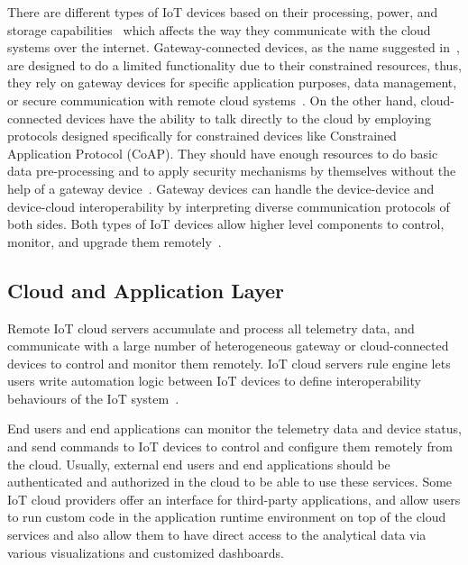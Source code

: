 There are different types of IoT devices based on their processing, power, and storage capabilities~\cite{bormann2014terminology} which affects the way they communicate with the cloud systems over the internet. Gateway-connected devices, as the name suggested in~\cite{securityUsenix2019}, are designed to do a limited functionality due to their constrained resources, thus, they rely on gateway devices for specific application purposes, data management, or secure communication with remote cloud systems~\cite{bormann2014terminology}. On the other hand, cloud-connected devices have the ability to talk directly to the cloud by employing protocols designed specifically for constrained devices like Constrained Application Protocol (CoAP). They should have enough resources to do basic data pre-processing and to apply security mechanisms by themselves without the help of a gateway device~\cite{stojkoska2017review,securityUsenix2019}. Gateway devices can handle the device-device and device-cloud interoperability by interpreting diverse communication protocols of both sides\cite{vcolakovic2018IoT}. Both types of IoT devices allow higher level components to control, monitor, and upgrade them remotely~\cite{eclipse2016three}.

\subsection{Cloud and Application Layer}
Remote IoT cloud servers accumulate and process all telemetry data, and communicate with a large number of heterogeneous gateway or cloud-connected devices to control and monitor them remotely. IoT cloud servers rule engine lets users write automation logic between IoT devices to define interoperability behaviours of the IoT system~\cite{securityUsenix2019}. 

End users and end applications can monitor the telemetry data and device status, and send commands to IoT devices to control and configure them remotely from the cloud. Usually, external end users and end applications should be authenticated and authorized in the cloud to be able to use these services. Some IoT cloud providers offer an interface for third-party applications, and allow users to run custom code in the application runtime environment on top of the cloud services\cite{vcolakovic2018IoT} and also allow them to have direct access to the analytical data via various visualizations and customized dashboards.


